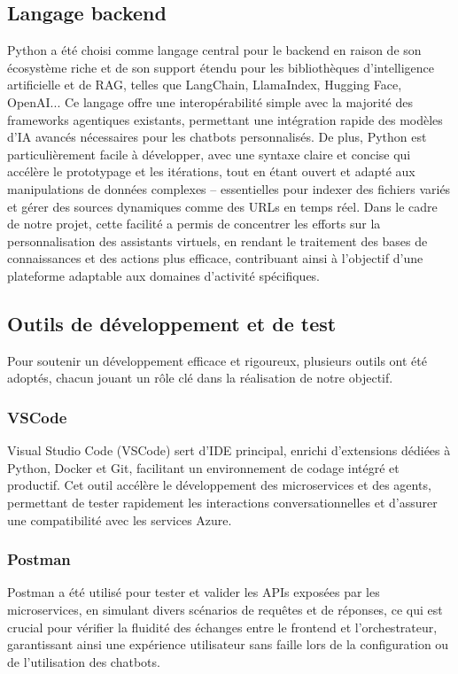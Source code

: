 \subsection{Langage backend}
Python \cite{python-docs} a été choisi comme langage central pour le backend en raison de son écosystème riche et de son support étendu pour les bibliothèques d'intelligence artificielle et de RAG, telles que LangChain, LlamaIndex, Hugging Face, OpenAI... Ce langage offre une interopérabilité simple avec la majorité des frameworks agentiques existants, permettant une intégration rapide des modèles d'IA avancés nécessaires pour les chatbots personnalisés. De plus, Python est particulièrement facile à développer, avec une syntaxe claire et concise qui accélère le prototypage et les itérations, tout en étant ouvert et adapté aux manipulations de données complexes – essentielles pour indexer des fichiers variés et gérer des sources dynamiques comme des URLs en temps réel. Dans le cadre de notre projet, cette facilité a permis de concentrer les efforts sur la personnalisation des assistants virtuels, en rendant le traitement des bases de connaissances et des actions plus efficace, contribuant ainsi à l'objectif d'une plateforme adaptable aux domaines d'activité spécifiques.


\subsection{Outils de développement et de test}
Pour soutenir un développement efficace et rigoureux, plusieurs outils ont été adoptés, chacun jouant un rôle clé dans la réalisation de notre objectif.
\subsubsection{VSCode}
Visual Studio Code \cite{vscode-docs} (VSCode) sert d'IDE principal, enrichi d'extensions dédiées à Python, Docker et Git, facilitant un environnement de codage intégré et productif. Cet outil accélère le développement des microservices et des agents, permettant de tester rapidement les interactions conversationnelles et d'assurer une compatibilité avec les services Azure.
\subsubsection{Postman}
Postman \cite{postman-docs} a été utilisé pour tester et valider les APIs exposées par les microservices, en simulant divers scénarios de requêtes et de réponses, ce qui est crucial pour vérifier la fluidité des échanges entre le frontend et l'orchestrateur, garantissant ainsi une expérience utilisateur sans faille lors de la configuration ou de l'utilisation des chatbots.
